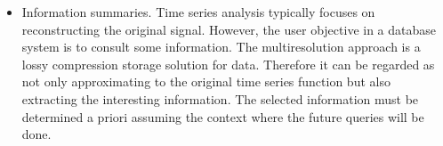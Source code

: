 \begin{itemize}
\item Information summaries. Time series analysis typically focuses on
  reconstructing the original signal. However, the user objective in a
  database system is to consult some information. The multiresolution
  approach is a lossy compression storage solution for data. Therefore
  it can be regarded as not only approximating to the
  original time series function but also extracting the interesting
  information. The selected information must be determined a priori
  assuming the context where the future queries will be done.

\end{itemize}















